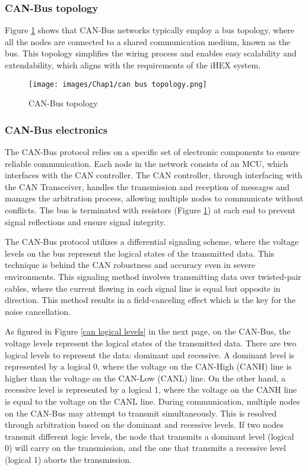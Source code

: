 \subsubsection{CAN-Bus topology}
Figure \ref{can topology} shows that CAN-Bus networks typically employ a bus topology, where all the nodes are connected to a shared communication medium, known as the bus. This topology simplifies the wiring process and enables easy scalability and extendability, which aligns with the requirements of the iHEX system.

\begin{figure}[H]
\begin{center}
\texttt{[image: images/Chap1/can bus topology.png]}\\
\caption{CAN-Bus topology \cite{R12}}
\label{can topology}
\end{center}
\end{figure} 

\subsubsection{CAN-Bus electronics}

The CAN-Bus protocol relies on a specific set of electronic components to ensure reliable communication. Each node in the network consists of an MCU, which interfaces with the CAN controller. The CAN controller, through interfacing with the CAN Transceiver, handles the transmission and reception of messages and manages the arbitration process, allowing multiple nodes to communicate without conflicts. The bus is terminated with resistors (Figure \ref{can topology}) at each end to prevent signal reflections and ensure signal integrity. \cite{R12}

The CAN-Bus protocol utilizes a differential signaling scheme, where the voltage levels on the bus represent the logical states of the transmitted data. This technique is behind the CAN robustness and accuracy even in severe environments. This signaling method involves transmitting data over twisted-pair cables, where the current flowing in each signal line is equal but opposite in direction. This method results in a field-canceling effect which is the key for the noise cancellation. \cite{R12}

As figured in Figure \ref{can logical levels} in the next page, on the CAN-Bus, the voltage levels represent the logical states of the transmitted data. There are two logical levels to represent the data: dominant and recessive.
A dominant level is represented by a logical 0, where the voltage on the CAN-High (CANH) line is higher than the voltage on the CAN-Low (CANL) line.
On the other hand, a recessive level is represented by a logical 1, where the voltage on the CANH line is equal to the voltage on the CANL line.
During communication, multiple nodes on the CAN-Bus may attempt to transmit simultaneously. This is resolved through arbitration based on the dominant and recessive levels. If two nodes transmit different logic levels, the node that transmits a dominant level (logical 0) will carry on the transmission, and the one that transmits a recessive level (logical 1) aborts the transmission. \cite{R12}

